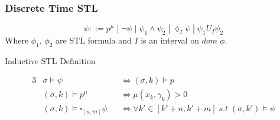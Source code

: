 \documentclass{article}
\theoremstyle{definition}
\begin{document}
\subsubsection{Discrete Time STL}
\begin{equation}
    \psi ::= p^\mu\;|\;\lnot \psi\;|\;\psi_1 \land \psi_2\;|\;\lozenge_{I} \psi\;|\;\psi_1 U_{I} \psi_2
\end{equation}
Where $\phi_1$, $\phi_2$ are STL formula and $I$ is an interval on $dom\;\phi$.

\begin{center}
    Inductive STL Definition
\end{center}
\begin{alignat*}{3}
            &\sigma \models \psi &&\Leftrightarrow (\sigma, k) \models p \\
            &(\sigma, k) \models p^\mu \quad &&\Leftrightarrow \mu(x_k, \gamma_k) > 0\\
            &(\sigma, k) \models \square_{[n,m]} \psi &&\Leftrightarrow \forall k' \in [k' + n, k' + m]\;s.t\;(\sigma, k') \models \psi
\end{alignat*}






\end{document}
